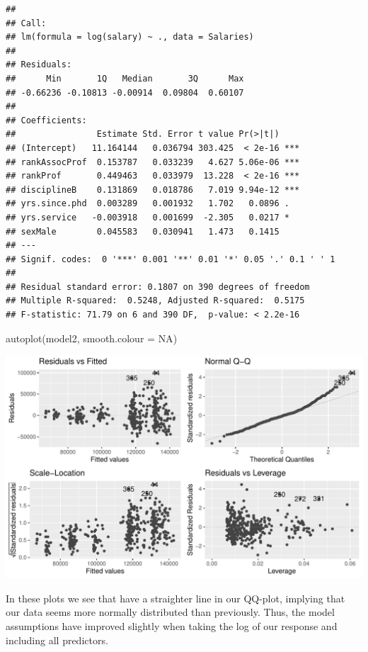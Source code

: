 \documentclass[
]{article}
\newenvironment{Shaded}{\begin{snugshade}}{\end{snugshade}}
\newcommand{\AttributeTok}[1]{\textcolor[rgb]{0.77,0.63,0.00}{#1}}
\newcommand{\ConstantTok}[1]{\textcolor[rgb]{0.00,0.00,0.00}{#1}}
\newcommand{\FunctionTok}[1]{\textcolor[rgb]{0.00,0.00,0.00}{#1}}
\newcommand{\NormalTok}[1]{#1}
\begin{document}
\begin{verbatim}
## 
## Call:
## lm(formula = log(salary) ~ ., data = Salaries)
## 
## Residuals:
##      Min       1Q   Median       3Q      Max 
## -0.66236 -0.10813 -0.00914  0.09804  0.60107 
## 
## Coefficients:
##                Estimate Std. Error t value Pr(>|t|)    
## (Intercept)   11.164144   0.036794 303.425  < 2e-16 ***
## rankAssocProf  0.153787   0.033239   4.627 5.06e-06 ***
## rankProf       0.449463   0.033979  13.228  < 2e-16 ***
## disciplineB    0.131869   0.018786   7.019 9.94e-12 ***
## yrs.since.phd  0.003289   0.001932   1.702   0.0896 .  
## yrs.service   -0.003918   0.001699  -2.305   0.0217 *  
## sexMale        0.045583   0.030941   1.473   0.1415    
## ---
## Signif. codes:  0 '***' 0.001 '**' 0.01 '*' 0.05 '.' 0.1 ' ' 1
## 
## Residual standard error: 0.1807 on 390 degrees of freedom
## Multiple R-squared:  0.5248, Adjusted R-squared:  0.5175 
## F-statistic: 71.79 on 6 and 390 DF,  p-value: < 2.2e-16
\end{verbatim}

\begin{Shaded}
\begin{Highlighting}[]
\FunctionTok{autoplot}\NormalTok{(model2, }\AttributeTok{smooth.colour =} \ConstantTok{NA}\NormalTok{)}
\end{Highlighting}
\end{Shaded}

\begin{center}\includegraphics{Compulsory-1_files/figure-latex/unnamed-chunk-8-1} \end{center}

In these plots we see that have a straighter line in our QQ-plot,
implying that our data seems more normally distributed than previously.
Thus, the model assumptions have improved slightly when taking the log
of our response and including all predictors.
\end{document}
